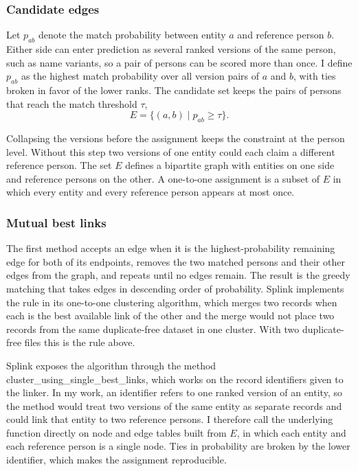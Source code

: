 \documentclass[11pt]{article}
\begin{document}
\subsubsection*{Candidate edges}

Let $p_{ab}$ denote the match probability between entity $a$ and reference person $b$. Either side can enter prediction as several ranked versions of the same person, such as name variants, so a pair of persons can be scored more than once. I define $p_{ab}$ as the highest match probability over all version pairs of $a$ and $b$, with ties broken in favor of the lower ranks. The candidate set keeps the pairs of persons that reach the match threshold $\tau$,
\[
E = \{(a, b) \mid p_{ab} \ge \tau\}.
\]

Collapsing the versions before the assignment keeps the constraint at the person level. Without this step two versions of one entity could each claim a different reference person. The set $E$ defines a bipartite graph with entities on one side and reference persons on the other. A one-to-one assignment is a subset of $E$ in which every entity and every reference person appears at most once.

\subsubsection*{Mutual best links}

The first method accepts an edge when it is the highest-probability remaining edge for both of its endpoints, removes the two matched persons and their other edges from the graph, and repeats until no edges remain. The result is the greedy matching that takes edges in descending order of probability. Splink implements the rule in its one-to-one clustering algorithm, which merges two records when each is the best available link of the other and the merge would not place two records from the same duplicate-free dataset in one cluster. With two duplicate-free files this is the rule above.

Splink exposes the algorithm through the method cluster\_using\_single\_best\_links, which works on the record identifiers given to the linker. In my work, an identifier refers to one ranked version of an entity, so the method would treat two versions of the same entity as separate records and could link that entity to two reference persons. I therefore call the underlying function directly on node and edge tables built from $E$, in which each entity and each reference person is a single node. Ties in probability are broken by the lower identifier, which makes the assignment reproducible.
\end{document}
